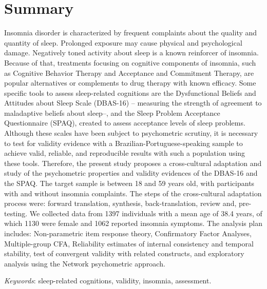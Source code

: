 \documentclass[
  ,doc,11pt, twoside,floatsintext]{apa6}
\begin{document}
\newpage

\begin{flushleft}
{
\tableofcontents
}
\end{flushleft}

\newpage

\thispagestyle{empty}

\hypertarget{summary}{%
\section{Summary}\label{summary}}

Insomnia disorder is characterized by frequent complaints about the quality and quantity of sleep. Prolonged exposure may cause physical and psychological damage. Negatively toned activity about sleep is a known reinforcer of insomnia. Because of that, treatments focusing on cognitive components of insomnia, such as Cognitive Behavior Therapy and Acceptance and Commitment Therapy, are popular alternatives or complements to drug therapy with known efficacy. Some specific tools to assess sleep-related cognitions are the Dysfunctional Beliefs and Attitudes about Sleep Scale (DBAS-16) -- measuring the strength of agreement to maladaptive beliefs about sleep--, and the Sleep Problem Acceptance Questionnaire (SPAQ), created to assess acceptance levels of sleep problems. Although these scales have been subject to psychometric scrutiny, it is necessary to test for validity evidence with a Brazilian-Portuguese-speaking sample to achieve valid, reliable, and reproducible results with such a population using these tools. Therefore, the present study proposes a cross-cultural adaptation and study of the psychometric properties and validity evidences of the DBAS-16 and the SPAQ. The target sample is between 18 and 59 years old, with participants with and without insomnia complaints. The steps of the cross-cultural adaptation process were: forward translation, synthesis, back-translation, review and, pre-testing. We collected data from 1397 individuals with a mean age of 38.4 years, of which 1130 were female and 1062 reported insomnia symptoms. The analysis plan includes: Non-parametric item response theory, Confirmatory Factor Analyses, Multiple-group CFA, Reliability estimates of internal consistency and temporal stability, test of convergent validity with related constructs, and exploratory analysis using the Network psychometric approach.

\begin{flushleft}
\emph{Keywords}: sleep-related cognitions, validity, insomnia, assessment.
\end{flushleft}
\end{document}
